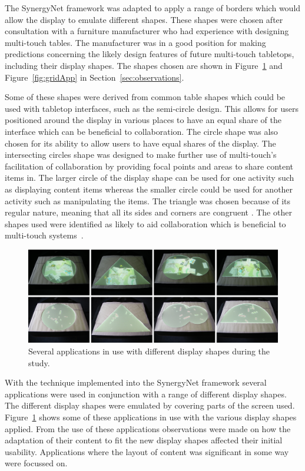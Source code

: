 \documentclass[review,5p,times,twocolumn]{elsarticle}
\begin{document}
The SynergyNet framework was adapted to apply a range of borders which would allow the display to emulate different shapes.
These shapes were chosen after consultation with a furniture manufacturer who had experience with designing multi-touch tables.
The manufacturer was in a good position for making predictions concerning the likely design features of future multi-touch tabletops, including their display shapes.
The shapes chosen are shown in Figure~\ref{fig:study} and Figure~\ref{fig:gridApp} in Section~\ref{sec:observations}.

Some of these shapes were derived from common table shapes which could be used with tabletop interfaces, such as the semi-circle design.
This allows for users positioned around the display in various places to have an equal share of the interface which can be beneficial to collaboration.
The circle shape was also chosen for its ability to allow users to have equal shares of the display.
The intersecting circles shape was designed to make further use of multi-touch's facilitation of collaboration by providing focal points and areas to share content items in.
The larger circle of the display shape can be used for one activity such as displaying content items whereas the smaller circle could be used for another activity such as manipulating the items.
The triangle was chosen because of its regular nature, meaning that all its sides and corners are congruent \cite{coxeter_1969}.
The other shapes used were identified as likely to aid collaboration which is beneficial to multi-touch systems~\cite{higgins2011}.

\begin{figure}[t!] 
	\centerline{\includegraphics[width=1\textwidth]{figures/study.png}}
	\caption{Several applications in use with different display shapes during the study.}
	\label{fig:study}
\end{figure}

With the technique implemented into the SynergyNet framework several applications were used in conjunction with a range of different display shapes.
The different display shapes were emulated by covering parts of the screen used.
Figure~\ref{fig:study} shows some of these applications in use with the various display shapes applied.
From the use of these applications observations were made on how the adaptation of their content to fit the new display shapes affected their initial usability.
Applications where the layout of content was significant in some way were focussed on.
\end{document}
